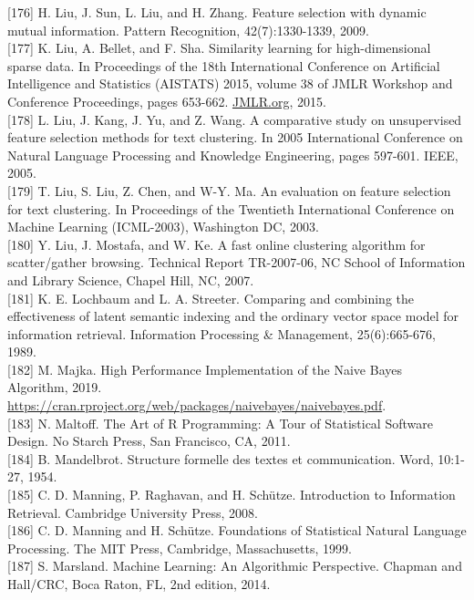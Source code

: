 \documentclass[10pt]{book}
\begin{document}
[176] H. Liu, J. Sun, L. Liu, and H. Zhang. Feature selection with dynamic mutual information. Pattern Recognition, 42(7):1330-1339, 2009.\\[0pt]
[177] K. Liu, A. Bellet, and F. Sha. Similarity learning for high-dimensional sparse data. In Proceedings of the 18th International Conference on Artificial Intelligence and Statistics (AISTATS) 2015, volume 38 of JMLR Workshop and Conference Proceedings, pages 653-662. \href{http://JMLR.org}{JMLR.org}, 2015.\\[0pt]
[178] L. Liu, J. Kang, J. Yu, and Z. Wang. A comparative study on unsupervised feature selection methods for text clustering. In 2005 International Conference on Natural Language Processing and Knowledge Engineering, pages 597-601. IEEE, 2005.\\[0pt]
[179] T. Liu, S. Liu, Z. Chen, and W-Y. Ma. An evaluation on feature selection for text clustering. In Proceedings of the Twentieth International Conference on Machine Learning (ICML-2003), Washington DC, 2003.\\[0pt]
[180] Y. Liu, J. Mostafa, and W. Ke. A fast online clustering algorithm for scatter/gather browsing. Technical Report TR-2007-06, NC School of Information and Library Science, Chapel Hill, NC, 2007.\\[0pt]
[181] K. E. Lochbaum and L. A. Streeter. Comparing and combining the effectiveness of latent semantic indexing and the ordinary vector space model for information retrieval. Information Processing \& Management, 25(6):665-676, 1989.\\[0pt]
[182] M. Majka. High Performance Implementation of the Naive Bayes Algorithm, 2019. \href{https://cran.rproject.org/web/packages/naivebayes/naivebayes.pdf}{https://cran.rproject.org/web/packages/naivebayes/naivebayes.pdf}.\\[0pt]
[183] N. Maltoff. The Art of R Programming: A Tour of Statistical Software Design. No Starch Press, San Francisco, CA, 2011.\\[0pt]
[184] B. Mandelbrot. Structure formelle des textes et communication. Word, 10:1-27, 1954.\\[0pt]
[185] C. D. Manning, P. Raghavan, and H. Schütze. Introduction to Information Retrieval. Cambridge University Press, 2008.\\[0pt]
[186] C. D. Manning and H. Schütze. Foundations of Statistical Natural Language Processing. The MIT Press, Cambridge, Massachusetts, 1999.\\[0pt]
[187] S. Marsland. Machine Learning: An Algorithmic Perspective. Chapman and Hall/CRC, Boca Raton, FL, 2nd edition, 2014.\\[0pt]
\end{document}

